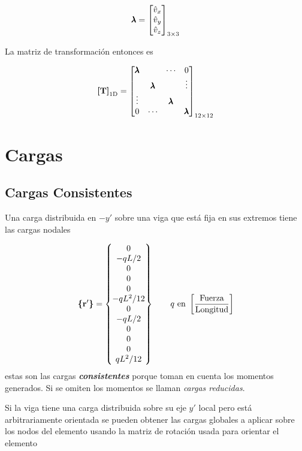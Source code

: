 \[
\pmb{\lambda} = \begin{bmatrix}
\hat{v}_x \\
\hat{v}_y \\
\hat{v}_z 
\end{bmatrix}_{3\times3}
\]

La matriz de transformación entonces es

\begin{equation}
	\boldsymbol{[}\mathbf{T} \boldsymbol{]}_{\mathrm{1D}}=\begin{bmatrix}
	\pmb{\lambda} & &\cdots & 0 \\
	 &\pmb{\lambda} &  &\vdots \\
	\vdots & &\pmb{\lambda} & \\
	0 &\cdots & & \pmb{\lambda}
	\end{bmatrix}_{12\times 12}
\end{equation}


\section{Cargas}
\subsection*{Cargas Consistentes}
Una carga distribuida en $-y'$ sobre una viga que está fija en sus extremos tiene las cargas nodales

\begin{equation} \label{eq:CargaDistribuidaElemento}
	\boldsymbol{\{ }\mathbf{r'} \boldsymbol{\}} = \begin{Bmatrix}
	0 \\
	-qL/2 \\
	0\\
	0\\
	0\\
	-qL^2/12\\
	0\\
	-qL/2 \\
	0\\
	0\\
	0\\
	qL^2/12
	\end{Bmatrix}
	\qquad q \text{  en } \left[\frac{\text{Fuerza}}{\text{Longitud}} \right]
\end{equation}
estas son las cargas \textbf{\textit{consistentes}} porque toman en cuenta los momentos generados. Si se omiten los momentos se llaman \textit{cargas reducidas}.

Si la viga tiene una carga distribuida sobre su eje $y'$ local pero está arbitrariamente orientada se pueden obtener las cargas globales a aplicar sobre los nodos del elemento usando la matriz de rotación usada para orientar el elemento

